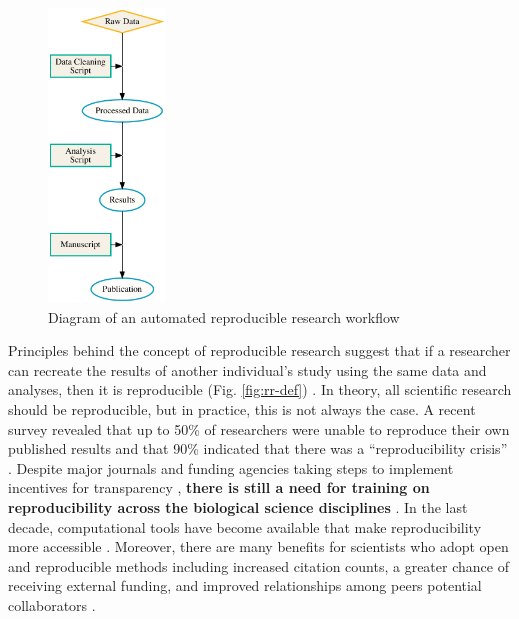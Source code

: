 \documentclass[12pt,letterpaper]{article}
\begin{document}
\begin{figure} %
  \includegraphics[width=0.275\textwidth]{figure/rr.pdf}
  \caption{Diagram of an automated reproducible research workflow}
  \label{fig:rr}
\end{figure}

Principles behind the concept of reproducible research suggest that if a researcher can recreate the results of another individual's study using the same data and analyses, then it is reproducible (Fig. \ref{fig:rr-def}) \citep{buckheit1995wavelab,peng2011reproducible,patil2016statistical}. 
In theory, all scientific research should be reproducible, but in practice, this is not always the case.
A recent survey revealed that up to 50\% of researchers were unable to reproduce their own published results and that 90\% indicated that there was a ``reproducibility crisis'' \citep{baker2016scientists}.
Despite major journals and funding agencies taking steps to implement incentives for transparency \citep{nature2017announcement}, \textbf{there is still a need for training on reproducibility across the biological science disciplines} \citep{barone2017unmet}.
In the last decade, computational tools have become available that make reproducibility more accessible \citep{boettiger2015introduction,wilson2016good}.
Moreover, there are many benefits for scientists who adopt open and reproducible methods including increased citation counts, a greater chance of receiving external funding, and improved relationships among peers potential collaborators \citep{mckiernan2016open,stewart-lowndes2017path,schmidt2016stepping}.
\end{document}
